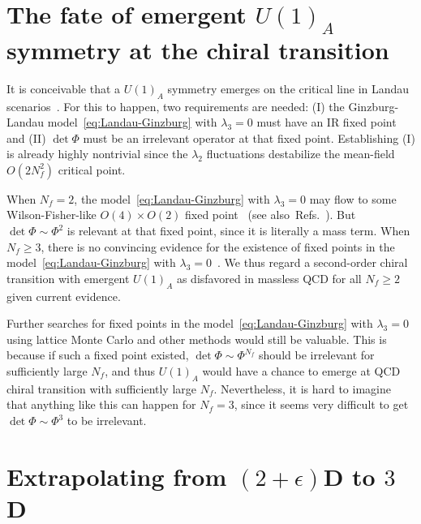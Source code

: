 \documentclass[
 reprint,







nofootinbib,


 amsmath,amssymb,
 aps,
 prd






tightenlines
]{revtex4-2}
\begin{document}
\section[The fate of emergent U(1)A symmetry at the chiral transition]{The fate of emergent $U(1)_A$ symmetry at the chiral transition}
\label{sec:U1A}




It is conceivable that a $U(1)_A$ symmetry emerges on the critical line in Landau scenarios~\cite{Cohen:1996ng,Lee:1996zy,Cohen:2002st,Fukushima:2008wg,Aoki:2012yj,Aoki:2012yj,Pelissetto:2013hqa,Cossu:2013uua,Pisarski:2024esv}.
For this to happen, two requirements are needed: (I) the Ginzburg-Landau model~\eqref{eq:Landau-Ginzburg} with $\lambda_3=0$ must have an IR fixed point and (II) $\det\Phi$ must be an irrelevant operator at that fixed point.
Establishing (I) is already highly nontrivial since the $\lambda_2$ fluctuations destabilize the mean-field $O(2N_f^2)$ critical point.

When $N_f=2$, the model~\eqref{eq:Landau-Ginzburg} with $\lambda_3=0$ may flow to some Wilson-Fisher-like $O(4)\times O(2)$ fixed point~\cite{Pelissetto:2013hqa,Nakayama:2014sba,Henriksson:2020fqi} (see also~Refs.~\cite{Yabunaka:2017uox,Yabunaka:2018mju,Sorokin:2021jwf,Sorokin:2022zwh,Sanchez-Villalobos:2024vmd}).
But $\det\Phi\sim\Phi^2$ is relevant at that fixed point, since it
is literally a mass term.
When $N_f\ge3$, there is no convincing evidence for the existence of fixed points in the model~\eqref{eq:Landau-Ginzburg} with $\lambda_3=0$~\cite{Pisarski:1983ms,Butti:2003nu,Calabrese:2004uk,Adzhemyan:2021sug,Fejos:2014qga,Resch:2017vjs,Fejos:2022mso,Fejos:2024bgl}.
We thus regard a second-order chiral transition with emergent $U(1)_A$ as disfavored in massless QCD for all $N_f\ge 2$ given current evidence.

Further searches for fixed points in the model~\eqref{eq:Landau-Ginzburg} with $\lambda_3=0$ using lattice Monte Carlo and other methods would still be valuable.
This is because if such a fixed point existed, $\det\Phi\sim\Phi^{N_f}$ should be irrelevant for sufficiently large $N_f$, and thus $U(1)_A$ would have a chance to emerge at QCD chiral transition with sufficiently large $N_f$.
Nevertheless, it is hard to imagine that anything like this can happen for $N_f=3$, since it seems very difficult to get $\det\Phi\sim\Phi^3$ to be irrelevant.




\section[Extrapolating from (2+epsilon)D to 3D]{Extrapolating from $(2+\epsilon)$D to $3$D}
\label{sec:epsilon_extrapolation}
\end{document}
